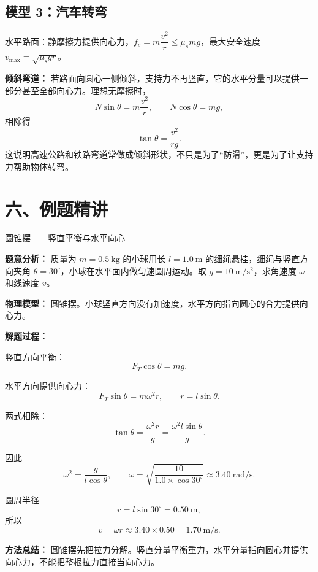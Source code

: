 \begin{center}
\begin{minipage}{0.94\textwidth}
\centering


\label{fig:vertical-circle-constraints}
\end{minipage}
\end{center}

\subsection*{模型 3：汽车转弯}

水平路面：静摩擦力提供向心力，$f_s = m\dfrac{v^2}{r} \leq \mu_s mg$，最大安全速度 $v_{\max} = \sqrt{\mu_s g r}$。

\textbf{倾斜弯道：} 若路面向圆心一侧倾斜，支持力不再竖直，它的水平分量可以提供一部分甚至全部向心力。理想无摩擦时，
\[
N\sin\theta=m\frac{v^2}{r},\qquad N\cos\theta=mg,
\]
相除得
\[
\tan\theta=\frac{v^2}{rg}.
\]
这说明高速公路和铁路弯道常做成倾斜形状，不只是为了“防滑”，更是为了让支持力帮助物体转弯。

\begin{center}


\label{fig:banked-curve}
\end{center}

\section*{六、例题精讲}

\begin{examplebox}{圆锥摆——竖直平衡与水平向心}

\textbf{题意分析：} 质量为 $m=0.5\ \mathrm{kg}$ 的小球用长 $l=1.0\ \mathrm{m}$ 的细绳悬挂，细绳与竖直方向夹角 $\theta=30^\circ$，小球在水平面内做匀速圆周运动。取 $g=10\ \mathrm{m/s^2}$，求角速度 $\omega$ 和线速度 $v$。

\textbf{物理模型：} 圆锥摆。小球竖直方向没有加速度，水平方向指向圆心的合力提供向心力。

\begin{center}

\end{center}

\textbf{解题过程：}

竖直方向平衡：
\[
F_T\cos\theta=mg.
\]

水平方向提供向心力：
\[
F_T\sin\theta=m\omega^2r,\qquad r=l\sin\theta.
\]

两式相除：
\[
\tan\theta=\frac{\omega^2r}{g}
=\frac{\omega^2l\sin\theta}{g}.
\]

因此
\[
\omega^2=\frac{g}{l\cos\theta},\qquad
\omega=\sqrt{\frac{10}{1.0\times\cos30^\circ}}
\approx3.40\ \mathrm{rad/s}.
\]

圆周半径
\[
r=l\sin30^\circ=0.50\ \mathrm{m},
\]
所以
\[
v=\omega r\approx3.40\times0.50=1.70\ \mathrm{m/s}.
\]

\textbf{方法总结：} 圆锥摆先把拉力分解。竖直分量平衡重力，水平分量指向圆心并提供向心力，不能把整根拉力直接当向心力。
\end{examplebox}

